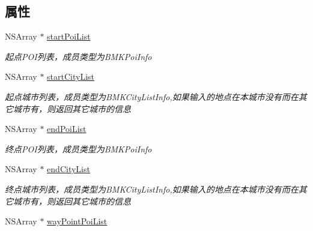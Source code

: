 \subsection*{属性}
\begin{DoxyCompactItemize}
\item 
\hypertarget{interface_b_m_k_suggest_addr_info_aca634e3aa38db8cb6127c080969ad327}{}N\+S\+Array $\ast$ \hyperlink{interface_b_m_k_suggest_addr_info_aca634e3aa38db8cb6127c080969ad327}{start\+Poi\+List}\label{interface_b_m_k_suggest_addr_info_aca634e3aa38db8cb6127c080969ad327}

\begin{DoxyCompactList}\small\item\em 起点\+P\+O\+I列表，成员类型为\+B\+M\+K\+Poi\+Info \end{DoxyCompactList}\item 
\hypertarget{interface_b_m_k_suggest_addr_info_afdffb61936341d125e268202000ae551}{}N\+S\+Array $\ast$ \hyperlink{interface_b_m_k_suggest_addr_info_afdffb61936341d125e268202000ae551}{start\+City\+List}\label{interface_b_m_k_suggest_addr_info_afdffb61936341d125e268202000ae551}

\begin{DoxyCompactList}\small\item\em 起点城市列表，成员类型为\+B\+M\+K\+City\+List\+Info,如果输入的地点在本城市没有而在其它城市有，则返回其它城市的信息 \end{DoxyCompactList}\item 
\hypertarget{interface_b_m_k_suggest_addr_info_a4e7a759214b84050b0b47d059eb3ed9d}{}N\+S\+Array $\ast$ \hyperlink{interface_b_m_k_suggest_addr_info_a4e7a759214b84050b0b47d059eb3ed9d}{end\+Poi\+List}\label{interface_b_m_k_suggest_addr_info_a4e7a759214b84050b0b47d059eb3ed9d}

\begin{DoxyCompactList}\small\item\em 终点\+P\+O\+I列表，成员类型为\+B\+M\+K\+Poi\+Info \end{DoxyCompactList}\item 
\hypertarget{interface_b_m_k_suggest_addr_info_a4ab8bde0ab4def7c2de3a57b7447e16a}{}N\+S\+Array $\ast$ \hyperlink{interface_b_m_k_suggest_addr_info_a4ab8bde0ab4def7c2de3a57b7447e16a}{end\+City\+List}\label{interface_b_m_k_suggest_addr_info_a4ab8bde0ab4def7c2de3a57b7447e16a}

\begin{DoxyCompactList}\small\item\em 终点城市列表，成员类型为\+B\+M\+K\+City\+List\+Info,如果输入的地点在本城市没有而在其它城市有，则返回其它城市的信息 \end{DoxyCompactList}\item 
\hypertarget{interface_b_m_k_suggest_addr_info_aa84760d7426d319275a06d1e2169bb91}{}N\+S\+Array $\ast$ \hyperlink{interface_b_m_k_suggest_addr_info_aa84760d7426d319275a06d1e2169bb91}{way\+Point\+Poi\+List}\label{interface_b_m_k_suggest_addr_info_aa84760d7426d319275a06d1e2169bb91}


\end{DoxyCompactItemize}
